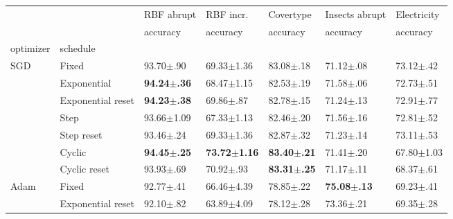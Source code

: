 \begin{tabular}{lllllll}
    \toprule
                             &                   & RBF abrupt              & RBF incr.                & Covertype               & Insects abrupt          & Electricity             \\
                             &                   & accuracy                & accuracy                 & accuracy                & accuracy                & accuracy                \\
    optimizer                & schedule          &                         &                          &                         &                         &                         \\
    \midrule
    \multirow[c]{7}{*}{SGD}  & Fixed             & 93.70$\pm$.90           & 69.33$\pm$1.36           & 83.08$\pm$.18           & 71.12$\pm$.08           & 73.12$\pm$.42           \\
                             & Exponential       & \bfseries 94.24$\pm$.36 & 68.47$\pm$1.15           & 82.53$\pm$.19           & 71.58$\pm$.06           & 72.73$\pm$.51           \\
                             & Exponential reset & \bfseries 94.23$\pm$.38 & 69.86$\pm$.87            & 82.78$\pm$.15           & 71.24$\pm$.13           & 72.91$\pm$.77           \\
                             & Step              & 93.66$\pm$1.09          & 67.33$\pm$1.13           & 82.46$\pm$.20           & 71.56$\pm$.16           & 72.81$\pm$.52           \\
                             & Step reset        & 93.46$\pm$.24           & 69.33$\pm$1.36           & 82.87$\pm$.32           & 71.23$\pm$.14           & 73.11$\pm$.53           \\
                             & Cyclic            & \bfseries 94.45$\pm$.25 & \bfseries 73.72$\pm$1.16 & \bfseries 83.40$\pm$.21 & 71.41$\pm$.20           & 67.80$\pm$1.03          \\
                             & Cyclic reset      & 93.93$\pm$.69           & 70.92$\pm$.93            & \bfseries 83.31$\pm$.25 & 71.17$\pm$.11           & 68.37$\pm$.61           \\
    \multirow[c]{4}{*}{Adam} & Fixed             & 92.77$\pm$.41           & 66.46$\pm$4.39           & 78.85$\pm$.22           & \bfseries 75.08$\pm$.13 & 69.23$\pm$.41           \\
                             & Exponential reset & 92.10$\pm$.82           & 63.89$\pm$4.09           & 78.12$\pm$.28           & 73.36$\pm$.21           & 69.35$\pm$.28           \\

\end{tabular}
